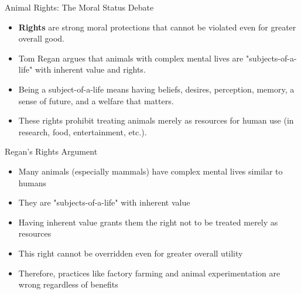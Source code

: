 \documentclass{beamer}
\begin{document}
	\begin{frame}{Animal Rights: The Moral Status Debate}
		\begin{itemize}
			\item \textbf{Rights} are strong moral protections that cannot be violated even for greater overall good.
			\item Tom Regan argues that animals with complex mental lives are "subjects-of-a-life" with inherent value and rights.
			\item Being a subject-of-a-life means having beliefs, desires, perception, memory, a sense of future, and a welfare that matters.
			\item These rights prohibit treating animals merely as resources for human use (in research, food, entertainment, etc.).
		\end{itemize}
		
		\begin{alertblock}{Regan's Rights Argument}
			\scriptsize
			\begin{itemize}
				\item Many animals (especially mammals) have complex mental lives similar to humans
				\item They are "subjects-of-a-life" with inherent value
				\item Having inherent value grants them the right not to be treated merely as resources
				\item This right cannot be overridden even for greater overall utility
				\item Therefore, practices like factory farming and animal experimentation are wrong regardless of benefits
			\end{itemize}
		\end{alertblock}
	\end{frame}
	
\end{document}
